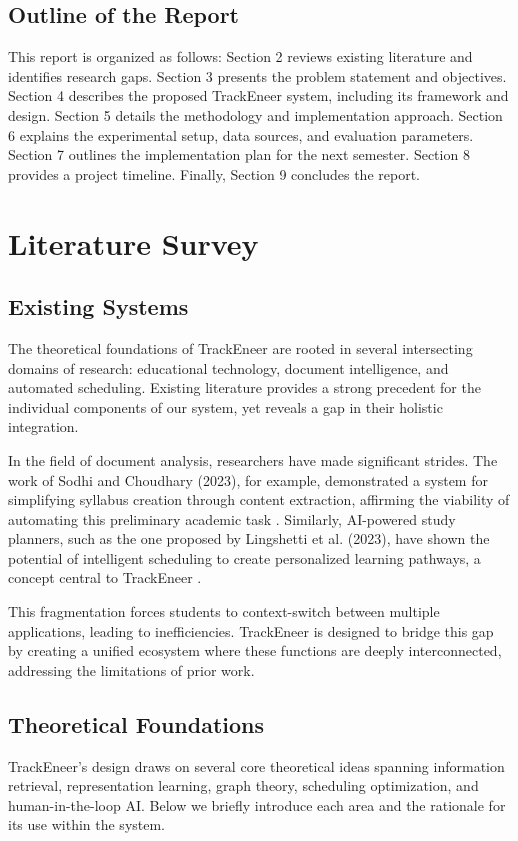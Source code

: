 \documentclass[12pt]{article}
\begin{document}
\subsection{Outline of the Report}
This report is organized as follows: Section 2 reviews existing literature and identifies research gaps. Section 3 presents the problem statement and objectives. Section 4 describes the proposed TrackEneer system, including its framework and design. Section 5 details the methodology and implementation approach. Section 6 explains the experimental setup, data sources, and evaluation parameters. Section 7 outlines the implementation plan for the next semester. Section 8 provides a project timeline. Finally, Section 9 concludes the report.

\section{Literature Survey}
\subsection{Existing Systems}
The theoretical foundations of TrackEneer are rooted in several intersecting domains of research: educational technology, document intelligence, and automated scheduling. Existing literature provides a strong precedent for the individual components of our system, yet reveals a gap in their holistic integration.

In the field of document analysis, researchers have made significant strides. The work of Sodhi and Choudhary (2023), for example, demonstrated a system for simplifying syllabus creation through content extraction, affirming the viability of automating this preliminary academic task \cite{b1}. Similarly, AI-powered study planners, such as the one proposed by Lingshetti et al. (2023), have shown the potential of intelligent scheduling to create personalized learning pathways, a concept central to TrackEneer \cite{b4}.

This fragmentation forces students to context-switch between multiple applications, leading to inefficiencies. TrackEneer is designed to bridge this gap by creating a unified ecosystem where these functions are deeply interconnected, addressing the limitations of prior work.

\subsection{Theoretical Foundations}
TrackEneer's design draws on several core theoretical ideas spanning information retrieval, representation learning, graph theory, scheduling optimization, and human-in-the-loop AI. Below we briefly introduce each area and the rationale for its use within the system.
\end{document}
